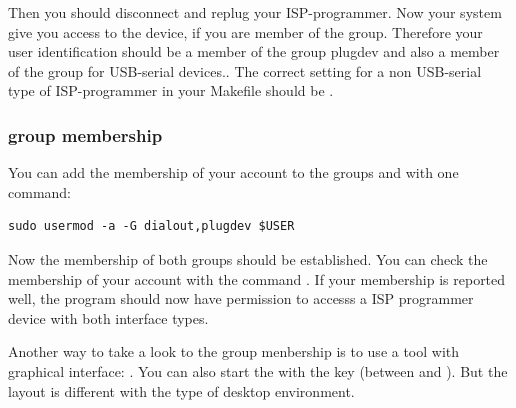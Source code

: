 Then you should disconnect and replug your ISP-programmer.
Now your system give you access to the device, if you are member of the  group.
Therefore your user identification should be a member of the group plugdev and also
a member of the group  for USB-serial devices..
The correct setting for a non USB-serial type of ISP-programmer
in your Makefile should be .\\

\subsubsection{group membership}
 
You can add the membership of your account to the groups  and  with one command:
\begin{large} \vspace{-0.4em} \begin{verbatim}
sudo usermod -a -G dialout,plugdev $USER
\end{verbatim} \end{large}
Now the membership of both groups should be established.
You can check the membership of your account with the command .
If your membership is reported well, the program  should now have permission to accesss
a ISP programmer device with both interface types.

Another way to take a look to the group menbership is to use a tool with
graphical  interface:
.
You can also start the  with the \keys{\winmenu} key (between  and
\keys{\Alt}).
But the layout is different with the type of desktop environment.

